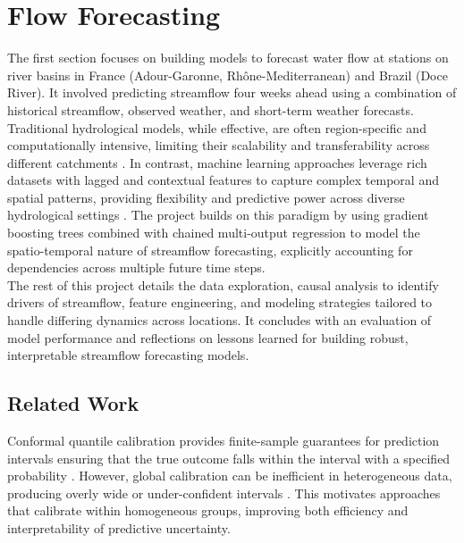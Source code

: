 \documentclass[ruler]{CUP-JNL-EDS}%
\begin{document}
\section{Flow Forecasting}
The first section focuses on building models to forecast water flow at stations on river basins in 
France (Adour-Garonne, Rhône-Mediterranean) and Brazil (Doce River). It involved 
predicting streamflow four weeks ahead using a combination of historical streamflow, 
observed weather, and short-term weather forecasts.\\ 

Traditional hydrological models, while effective, are often region-specific and computationally intensive, 
limiting their scalability and transferability across different catchments \citep{beven2012rainfall,singh1995}. 
In contrast, machine learning approaches leverage rich datasets with lagged and contextual features to 
capture complex temporal and spatial patterns, providing flexibility and predictive power across diverse 
hydrological settings \citep{mosavi2018, kratzert2019}. The project builds on this paradigm by using gradient boosting 
trees \citep{prokhorenkova2018} combined with chained multi-output regression \citep{spyromitros2016} to model the spatio-temporal nature of streamflow forecasting, explicitly accounting for dependencies across 
multiple future time steps. \\

The rest of this project details the data exploration, causal analysis to identify drivers of streamflow, 
feature engineering, and modeling strategies tailored to handle differing dynamics across locations. 
It concludes with an evaluation of model performance and reflections on lessons learned for building 
robust, interpretable streamflow forecasting models.

\subsection{Related Work}
Conformal quantile calibration provides finite-sample guarantees for prediction intervals ensuring 
that the true outcome falls within the interval with a specified probability \citep{romano2019}.
However, global calibration can be inefficient in heterogeneous data, producing overly wide or 
under-confident intervals \citep{angebates2022}. This motivates approaches that calibrate within 
homogeneous groups, improving both efficiency and interpretability of predictive uncertainty.
\end{document}

